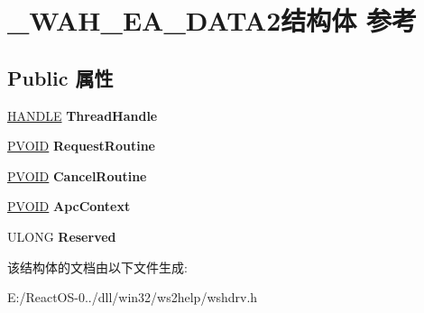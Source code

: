\hypertarget{struct___w_a_h___e_a___d_a_t_a2}{}\section{\+\_\+\+W\+A\+H\+\_\+\+E\+A\+\_\+\+D\+A\+T\+A2结构体 参考}
\label{struct___w_a_h___e_a___d_a_t_a2}
\subsection*{Public 属性}
\begin{DoxyCompactItemize}
\item 
\mbox{\label{struct___w_a_h___e_a___d_a_t_a2_a6ebbadaf410eabc4861e859cfc4325b0}} 
\hyperlink{interfacevoid}{H\+A\+N\+D\+LE} {\bfseries Thread\+Handle}
\item 
\mbox{\label{struct___w_a_h___e_a___d_a_t_a2_a00579cf039b7c111e4ac63b99dd1eb65}} 
\hyperlink{interfacevoid}{P\+V\+O\+ID} {\bfseries Request\+Routine}
\item 
\mbox{\label{struct___w_a_h___e_a___d_a_t_a2_a8f5986db0365cadf54756b5035d0a845}} 
\hyperlink{interfacevoid}{P\+V\+O\+ID} {\bfseries Cancel\+Routine}
\item 
\mbox{\label{struct___w_a_h___e_a___d_a_t_a2_a6b042c8d553a028abd5eb759af28d156}} 
\hyperlink{interfacevoid}{P\+V\+O\+ID} {\bfseries Apc\+Context}
\item 
\mbox{\label{struct___w_a_h___e_a___d_a_t_a2_adef023f6c3473b171e75056b3b99949c}} 
U\+L\+O\+NG {\bfseries Reserved}
\end{DoxyCompactItemize}


该结构体的文档由以下文件生成\+:\begin{DoxyCompactItemize}
\item 
E\+:/\+React\+O\+S-\/0../dll/win32/ws2help/wshdrv.\+h\end{DoxyCompactItemize}
